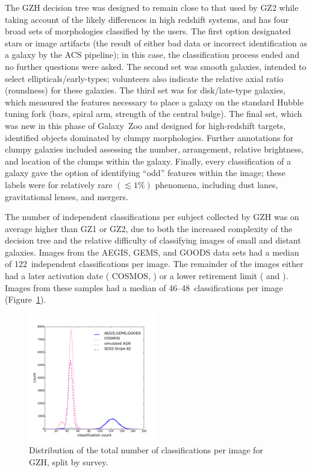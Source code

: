 \documentclass[twocolumn]{aastex6}
\begin{document}
The GZH decision tree was designed to remain close to that used by GZ2 while
taking account of the likely differences in high redshift systems, and has four
broad sets of morphologies classified by the users.  The first option
designated stars or image artifacts (the result of either bad data or incorrect
identification as a galaxy by the ACS pipeline); in this case, the
classification process ended and no further questions were asked. The second
set was smooth galaxies, intended to select ellipticals/early-types;
volunteers also indicate the relative axial ratio (roundness) for these
galaxies. The third set was for disk/late-type galaxies, which measured the
features necessary to place a galaxy on the standard Hubble tuning fork (bars,
spiral arm, strength of the central bulge). The final set, which was new in
this phase of Galaxy~Zoo and designed for high-redshift targets, identified
objects dominated by clumpy morphologies. Further annotations for clumpy
galaxies included assessing the number, arrangement, relative brightness, and
location of the clumps within the galaxy. Finally, every classification of a
galaxy gave the option of identifying ``odd'' features within the image; these
labels were for relatively rare $(\lesssim1\%)$ phenomena, including dust
lanes, gravitational lenses, and mergers. 

The number of independent classifications per subject collected by GZH was on
average higher than GZ1 or GZ2, due to both the increased complexity of the
decision tree and the relative difficulty of classifying images of small and
distant galaxies. Images from the \main{} AEGIS, GEMS, and GOODS data sets had
a median of 122~independent classifications per image. The remainder of the
images either had a later activation date (\main{} COSMOS, \simagn) or a lower
retirement limit (\stripe{} and \coadd). Images from these samples had a median
of 46--48~classifications per image (Figure~\ref{fig:classification_hist}).

\begin{figure}
\center
\includegraphics[width=0.5\textwidth]{figures/classification_hist.pdf}
\caption{Distribution of the total number of classifications per image for GZH,
split by survey.}
\label{fig:classification_hist}
\end{figure}
\end{document}
